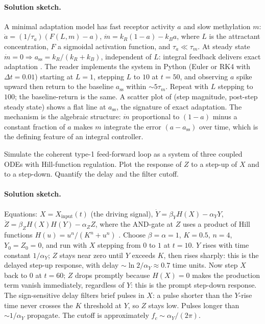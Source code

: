 \paragraph{Solution sketch.}
A minimal adaptation model has fast receptor activity $a$ and slow
methylation $m$:
$\dot a = (1/\tau_a)(F(L, m) - a)$,
$\dot m = k_R (1 - a) - k_B a$, where $L$ is the attractant
concentration, $F$ a sigmoidal activation function, and $\tau_a \ll
\tau_m$. At steady state $\dot m = 0 \Rightarrow a_{\text{ss}} =
k_R/(k_R + k_B)$, independent of $L$: integral feedback delivers
exact adaptation \cite{paper:v6c01-yi-2000}. The reader implements
the system in Python (Euler or RK4 with $\Delta t = 0.01$) starting at
$L = 1$, stepping $L$ to $10$ at $t = 50$, and observing $a$ spike
upward then return to the baseline $a_{\text{ss}}$ within $\sim
5\tau_m$. Repeat with $L$ stepping to $100$; the baseline-return is
the same. A scatter plot of (step magnitude, post-step steady state)
shows a flat line at $a_{\text{ss}}$, the signature of exact
adaptation. The mechanism is the algebraic structure: $\dot m$
proportional to $(1-a)$ minus a constant fraction of $a$ makes $m$
integrate the error $(a - a_{\text{ss}})$ over time, which is the
defining feature of an integral controller.

\begin{exercise}
Simulate the coherent type-1 feed-forward loop as a system of three
coupled ODEs with Hill-function regulation. Plot the response of $Z$
to a step-up of $X$ and to a step-down. Quantify the delay and the
filter cutoff.
\end{exercise}

\paragraph{Solution sketch.}
Equations: $X = X_{\text{input}}(t)$ (the driving signal),
$\dot Y = \beta_Y H(X) - \alpha_Y Y$,
$\dot Z = \beta_Z H(X) H(Y) - \alpha_Z Z$, where the AND-gate at $Z$
uses a product of Hill functions $H(u) = u^n/(K^n + u^n)$
\cite[ch.~4]{text:alon-systems-biology,paper:v6c01-shoval-alon-2010}.
Choose $\beta = \alpha = 1$, $K = 0.5$, $n = 4$, $Y_0 = Z_0 = 0$,
and run with $X$ stepping from $0$ to $1$ at $t = 10$. $Y$ rises with
time constant $1/\alpha_Y$; $Z$ stays near zero until $Y$ exceeds
$K$, then rises sharply: this is the delayed step-up response, with
delay $\sim \ln 2/\alpha_Y \approx 0.7$ time units. Now step $X$ back
to $0$ at $t = 60$; $Z$ drops promptly because $H(X) = 0$ makes the
production term vanish immediately, regardless of $Y$: this is the
prompt step-down response. The sign-sensitive delay filters brief
pulses in $X$: a pulse shorter than the $Y$-rise time never crosses
the $K$ threshold at $Y$, so $Z$ stays low. Pulses longer than
$\sim 1/\alpha_Y$ propagate. The cutoff is approximately
$f_c \sim \alpha_Y/(2\pi)$.

